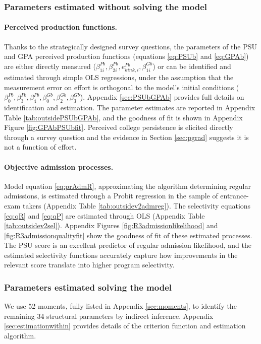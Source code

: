 \subsubsection{Parameters estimated without solving the model}

\paragraph{Perceived production functions.} Thanks to the strategically designed survey questions, the parameters of the PSU and GPA perceived production functions (equations \eqref{eq:PSUb} and \eqref{eq:GPAb}) are either directly measured ($\beta_{1i}^{Pb},\beta_{2i}^{Pb},e^{Pb}_{kink,i},\beta_{1i}^{Gb}$) or can be identified and estimated through simple OLS regressions, under the assumption that the measurement error on effort is orthogonal to the model's initial conditions ($\beta_0^{Pb},\beta_3^{Pb},\beta_4^{Pb},\beta_0^{Gb},\beta_2^{Gb}, \beta_3^{Gb}$). Appendix \ref{sec:PSUbGPAb} provides full details on identification and estimation. The parameter estimates are reported in Appendix Table \ref{tab:outsidePSUbGPAb}, and the goodness of fit is shown in Appendix Figure \ref{fig:GPAbPSUbfit}. Perceived college persistence is elicited directly through a survey question and the evidence in Section \ref{sec:pgrad} suggests it is not a function of effort. \par 

\paragraph{Objective admission processes.} Model equation \eqref{eq:prAdmR}, approximating the algorithm determining regular admissions, is estimated through a Probit regression in the sample of entrance-exam takers (Appendix Table \ref{tab:outsidev2admreg}). The selectivity equations \eqref{eq:qR} and \eqref{eq:qP} are estimated through OLS (Appendix Table \ref{tab:outsidev2sel}). Appendix Figures \ref{fig:R3admissionlikelihood} and \ref{fig:R3admissionqualityfit} show the goodness of fit of these estimated processes. The PSU score is an excellent predictor of regular admission likelihood, and the estimated selectivity functions accurately capture how improvements in the relevant score translate into higher program selectivity. \par

\subsubsection{Parameters estimated solving the model}
We use 52 moments, fully listed in Appendix \ref{sec:moments}, to identify the remaining 34 structural parameters by indirect inference. Appendix \ref{sec:estimationwithin} provides details of the criterion function and estimation algorithm.\par 
